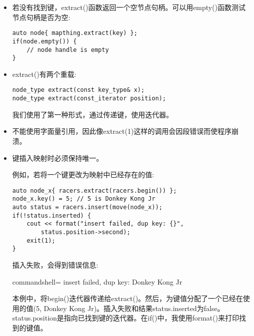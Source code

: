 \begin{itemize}
\item 
若没有找到键，extract()函数返回一个空节点句柄。可以用empty()函数测试节点句柄是否为空:

\begin{lstlisting}[style=styleCXX]
auto node{ mapthing.extract(key) };
if(node.empty()) {
	// node handle is empty
}
\end{lstlisting}

\item 
extract()有两个重载:

\begin{lstlisting}[style=styleCXX]
node_type extract(const key_type& x);
node_type extract(const_iterator position);
\end{lstlisting}

我们使用了第一种形式，通过传递键，使用迭代器。

\item 
不能使用字面量引用，因此像extract(1)这样的调用会因段错误而使程序崩溃。

\item 
键插入映射时必须保持唯一。

例如，若将一个键更改为映射中已经存在的值:

\begin{lstlisting}[style=styleCXX]
auto node_x{ racers.extract(racers.begin()) };
node_x.key() = 5; // 5 is Donkey Kong Jr
auto status = racers.insert(move(node_x));
if(!status.inserted) {
	cout << format("insert failed, dup key: {}",
		status.position->second);
	exit(1);
}
\end{lstlisting}

插入失败，会得到错误信息:

\begin{tcblisting}{commandshell={}}
insert failed, dup key: Donkey Kong Jr
\end{tcblisting}

本例中，将begin()迭代器传递给extract()。然后，为键值分配了一个已经在使用的值(5, Donkey Kong Jr)。插入失败和结果status.inserted为false。status.position是指向已找到键的迭代器。在if()中，我使用format()来打印找到的键值。
\end{itemize}







